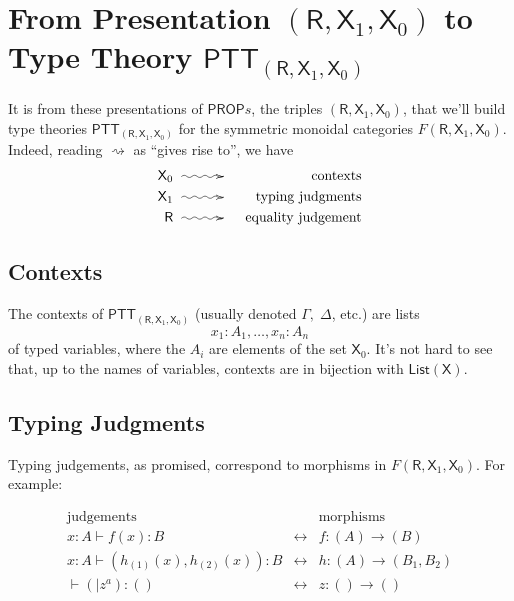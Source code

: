 \documentclass[pra,floatfix,
amsmath,superscriptaddress, 12pt]{article}
\theoremstyle{definition}
\newcommand{\msf}[1]{\mathsf{#1}}
\begin{document}
\section{From Presentation $(\msf{R},\msf{X}_1,\msf{X}_0)$ to Type Theory $\mathsf{PTT}_{(\msf{R},\msf{X}_1,\msf{X}_0)}$}

It is from these presentations of $\mathsf{PROP}s$, the triples $(\msf{R},\msf{X}_1,\msf{X}_0)$, that we'll build type theories $\mathsf{PTT}_{(\msf{R},\msf{X}_1,\msf{X}_0)}$ for the symmetric monoidal categories $F(\msf{R},\msf{X}_1,\msf{X}_0)$. Indeed, reading $\rightsquigarrow$ as ``gives rise to'', we have
    \begin{eqnarray*}
      \msf{X}_0
        & \xymatrix@C=3em{{}\ar@{~>}[r]&{}}
            & \mathrm{contexts} \\
      \msf{X}_1 & \xymatrix@C=3em{{}\ar@{~>}[r]&{}} & \mathrm{typing \ judgments} \\
      \msf{R}   & \xymatrix@C=3em{{}\ar@{~>}[r]&{}} & \mathrm{equality \ judgement}
    \end{eqnarray*}

\subsection{Contexts}

The contexts of $\mathsf{PTT}_{(\msf{R},\msf{X}_1,\msf{X}_0)}$ (usually denoted $\Gamma,\;\Delta$, etc.) are lists
    \[
        x_{1}:A_{1},\dots,x_{n}:A_{n}
    \]
of typed variables, where the $A_i$ are elements of the set $\msf{X}_{0}$. It's not hard to see that, up to the names of variables, contexts are in bijection with $\mathsf{List}(\msf{X})$.

\subsection{Typing Judgments}

Typing judgements, as promised, correspond to morphisms in $F(\msf{R},\msf{X}_1,\msf{X}_0)$. For example:

\begin{eqnarray*}
    \mathrm{judgements}
        &
          &
          \mathrm{morphisms} \\
    x:A\vdash f\left(x\right):B
        &
        \longleftrightarrow
            & f:(A) \longrightarrow (B) \\
    x:A\vdash\left(h_{\left(1\right)}\left(x\right),h_{\left(2\right)}\left(x\right)\right):B
        &
        \longleftrightarrow
            &
            h:(A)\longrightarrow\left(B_{1},B_{2}\right) \\
    \vdash\left(|z^{a}\right):\left(\right)
        &
        \longleftrightarrow
            &
            z:() \longrightarrow ()
\end{eqnarray*}
\end{document}
